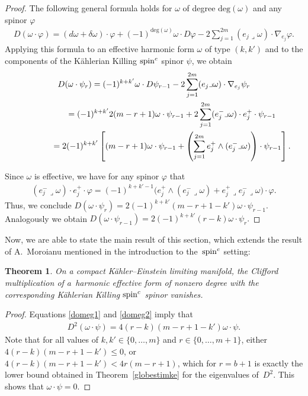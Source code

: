 \documentclass[10pt,a4paper]{amsart}
\numberwithin{equation}{section}
\newtheorem{thm}{Theorem}[section]
\theoremstyle{definition}
\begin{document}
\begin{proof}
The following general formula  holds for {\color{black}{any form}} $\omega$ of degree $\text{deg}(\omega)$ and any spinor $\varphi$
\begin{gather*}D(\omega\cdot\varphi)=(d\omega+\delta\omega)\cdot\varphi+(-1)^{\text{deg}(\omega)} \omega\cdot D\varphi -2\sum_{j=1}^{2m}(e_j\lrcorner\omega)\cdot \nabla_{e_j}\varphi.\end{gather*}
Applying this formula to an ef\/fective harmonic form $\omega$ of type $(k, k')$ and to the components of the  K\"ahlerian Killing ${\mathop{\rm spin}^c}$ spinor $\psi$, we obtain
\begin{gather*}
D(\omega\cdot\psi_{r}) = (-1)^{k+k'} \omega\cdot D\psi_{r-1}-2\sum_{j=1}^{2m}(e_j\lrcorner\omega)\cdot \nabla_{e_j}\psi_{r}\\
\hphantom{D(\omega\cdot\psi_{r})}{}
 =(-1)^{k+k'} 2(m-r+1) \omega\cdot\psi_{r-1}+2\sum_{j=1}^{2m}(e^-_j\lrcorner\omega)\cdot e^+_j\cdot \psi_{r-1}\\
\hphantom{D(\omega\cdot\psi_{r})}{}
=2(-1)^{k+k'} \left[(m-r+1) \omega\cdot\psi_{r-1}+\left(\sum_{j=1}^{2m} e^+_j\wedge(e^-_j\lrcorner\omega)\right)\cdot\psi_{r-1}\right].
\end{gather*}

Since $\omega$ is ef\/fective, we have for any spinor $\varphi$ that
\begin{gather*}(e^-_j\lrcorner\omega)\cdot e^+_j\cdot \varphi=(-1)^{k+k'-1} \big(e^+_j\wedge(e^-_j\lrcorner\omega)+e^+_j\lrcorner e^-_j\lrcorner\omega \big)\cdot \varphi.\end{gather*}
Thus, we conclude $D(\omega\cdot\psi_{r}) = 2 (-1)^{k+k'} (m-r+1-k') \omega\cdot \psi_{r-1}$.
Analogously we obtain $D(\omega\cdot\psi_{r-1})=2(-1)^{k+k'} (r-k) \omega\cdot\psi_{r}.$
\end{proof}

Now, we are able to state the main result of this section, which extends the result of A.~Moroianu mentioned in the introduction to the~${\mathop{\rm spin}^c}$ setting:
\begin{thm} \label{eff}
On a compact K\"ahler--Einstein limiting manifold, the Clifford multiplication of a~harmonic effective form of nonzero degree with the corresponding  K\"ahlerian Killing ${\mathop{\rm spin}^c}$ spinor vanishes.
\end{thm}

\begin{proof}
Equations \eqref{domeg1} and \eqref{domeg2} imply that
\begin{gather*}
D^2 (\omega \cdot \psi) = 4 (r-k)(m-r+1-k')  \omega\cdot \psi.
\end{gather*}
Note that for all values of $k,k' \in\{0,\dots,m\}$ and $r\in\{0,\dots, m+1\}$, either $4 (r-k)(m-r+1-k') \leq 0$, or $4 (r-k)(m-r+1-k') < 4r(m-r+1)$, which for $r=b+1$ is exactly the lower bound obtained in Theorem~\ref{globestimke} for the eigenvalues of~$D^2$. This shows that $\omega\cdot\psi=0$.
\end{proof}
\end{document}
